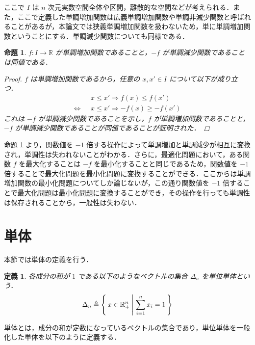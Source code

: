 \documentclass[a4paper,11pt]{jreport}
\newtheorem{definition}{定義}
\newtheorem{proposition}{命題}
\begin{document}
ここで $ I $ は $ n $ 次元実数空間全体や区間，離散的な空間などが考えられる．また，ここで定義した単調増加関数は広義単調増加関数や単調非減少関数と呼ばれることがあるが，本論文では狭義単調増加関数を扱わないため，単に単調増加関数ということにする．単調減少関数についても同様である．

\begin{proposition} \label{prop:keeping_monotonicity}
$ f : I \to \mathbb{R} $ が単調増加関数であることと，$ -f $ が単調減少関数であることは同値である．

\begin{proof}
$ f $ は単調増加関数であるから，任意の $ x, x' \in I $ について以下が成り立つ．
\begin{align*}
& x \leq x' \Rightarrow f(x) \leq f(x') \\
\Longleftrightarrow \hspace{8pt} & x \leq x' \Rightarrow -f(x) \geq -f(x')
\end{align*}
これは $ -f $ が単調減少関数であることを示し，$ f $ が単調増加関数であることと，$ -f $ が単調減少関数であることが同値であることが証明された．
\end{proof}

\end{proposition}

命題 \ref{prop:keeping_monotonicity} より，関数値を $ -1 $ 倍する操作によって単調増加と単調減少が相互に変換され，単調性は失われないことがわかる．さらに，最適化問題において，ある関数 $ f $ を最大化することは $ -f $ を最小化することと同じであるため，関数値を $ -1 $ 倍することで最大化問題を最小化問題に変換することができる．ここからは単調増加関数の最小化問題についてしか論じないが，この通り関数値を $ -1 $ 倍することで最大化問題は最小化問題に変換することができ，その操作を行っても単調性は保存されることから，一般性は失わない．\par

\section{単体}

本節では単体の定義を行う．

\begin{definition}
各成分の和が $ 1 $ である以下のようなベクトルの集合 $ \Delta_n $ を単位単体という．
$$ \Delta_n \triangleq \Set{ x \in \mathbb{R}^n_{+} | \sum_{i=1}^{n} x_i = 1 } $$
\end{definition}

単体とは，成分の和が定数になっているベクトルの集合であり，単位単体を一般化した単体を以下のように定義する．
\end{document}

